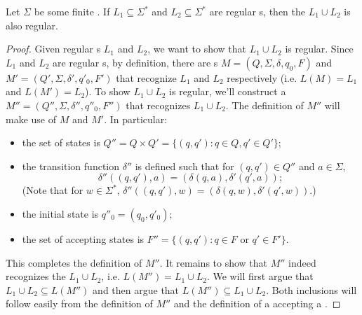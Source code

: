 \begin{flex}
\begin{theorem} \label{theorem:Regular-languages-are-closed-under-union}
Let $\Sigma$ be some finite . 
If $L_1 \subseteq \Sigma^*$ and $L_2 \subseteq \Sigma^*$ are regular s, then the  $L_1 \cup L_2$ is also regular.
\end{theorem}

\begin{proof}
Given regular s $L_1$ and $L_2$, we want to show that $L_1 \cup L_2$ is regular. Since $L_1$ and $L_2$ are regular s, by definition, there are s $M = (Q, \Sigma, \delta, q_0, F)$ and $M' = (Q', \Sigma, \delta', q'_0, F')$ that recognize $L_1$ and $L_2$ respectively (i.e. $L(M) = L_1$ and $L(M') = L_2$). 
To show $L_1 \cup L_2$ is regular, we'll construct a  $M'' = (Q'', \Sigma, \delta'', q''_0, F'')$ that recognizes $L_1 \cup L_2$. 
The definition of $M''$ will make use of $M$ and $M'$. 
In particular:
\begin{itemize}
    \item the set of states is $Q'' = Q \times Q' = \{(q, q') : q \in Q, q' \in Q'\}$;
    \item the transition function $\delta''$ is defined such that for $(q,q') \in Q''$ and $a \in \Sigma$, $$\delta''((q,q'), a) = (\delta(q,a), \delta'(q',a));$$
    (Note that for $w \in \Sigma^*$, $\delta''((q,q'), w) = (\delta(q,w), \delta'(q', w))$.)
    \item the initial state is $q''_0 = (q_0, q'_0)$;
    \item the set of accepting states is $F'' = \{(q, q') : q \in F \text{ or } q' \in F'\}$.
\end{itemize}
This completes the definition of $M''$. 
It remains to show that $M''$ indeed recognizes the  $L_1 \cup L_2$, i.e. $L(M'') = L_1 \cup L_2$. 
We will first argue that $L_1 \cup L_2 \subseteq L(M'')$ and then argue that $L(M'') \subseteq L_1 \cup L_2$. 
Both inclusions will follow easily from the definition of $M''$ and the definition of a  accepting a .


\end{proof}
\end{flex}
